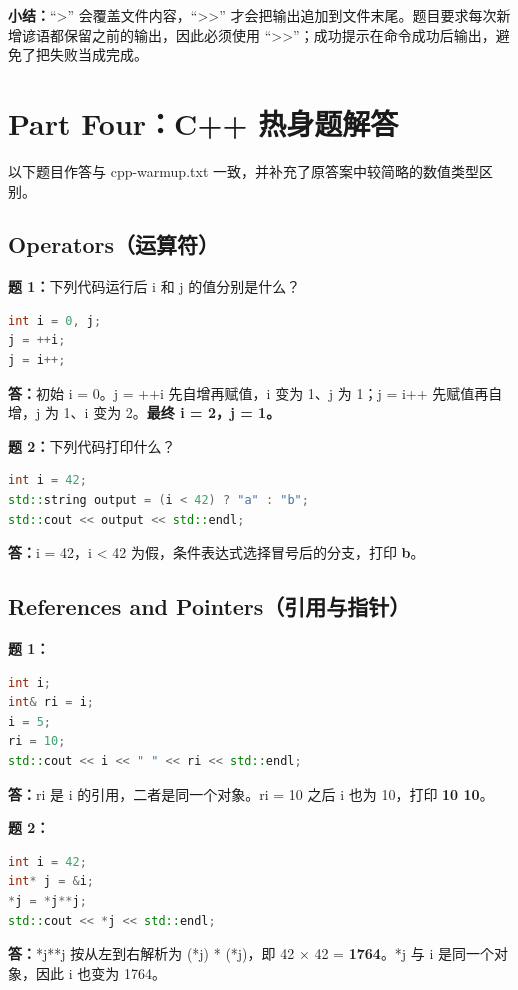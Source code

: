 \documentclass[12pt,a4paper]{ctexart}
\begin{document}
\textbf{小结：}``>'' 会覆盖文件内容，``>>'' 才会把输出追加到文件末尾。题目要求每次新增谚语都保留之前的输出，因此必须使用 ``>>''；成功提示在命令成功后输出，避免了把失败当成完成。

\newpage

\section{Part Four：C++ 热身题解答}

以下题目作答与 cpp-warmup.txt 一致，并补充了原答案中较简略的数值类型区别。

\subsection{Operators（运算符）}

\textbf{题 1：}下列代码运行后 i 和 j 的值分别是什么？
\begin{lstlisting}[language=C++]
int i = 0, j;
j = ++i;
j = i++;
\end{lstlisting}
\textbf{答：}初始 i = 0。j = ++i 先自增再赋值，i 变为 1、j 为 1；j = i++ 先赋值再自增，j 为 1、i 变为 2。\textbf{最终 i = 2，j = 1。}

\textbf{题 2：}下列代码打印什么？
\begin{lstlisting}[language=C++]
int i = 42;
std::string output = (i < 42) ? "a" : "b";
std::cout << output << std::endl;
\end{lstlisting}
\textbf{答：}i = 42，i < 42 为假，条件表达式选择冒号后的分支，打印 \textbf{b}。

\subsection{References and Pointers（引用与指针）}

\textbf{题 1：}
\begin{lstlisting}[language=C++]
int i;
int& ri = i;
i = 5;
ri = 10;
std::cout << i << " " << ri << std::endl;
\end{lstlisting}
\textbf{答：}ri 是 i 的引用，二者是同一个对象。ri = 10 之后 i 也为 10，打印 \textbf{10 10}。

\textbf{题 2：}
\begin{lstlisting}[language=C++]
int i = 42;
int* j = &i;
*j = *j**j;
std::cout << *j << std::endl;
\end{lstlisting}
\textbf{答：}*j**j 按从左到右解析为 (*j) * (*j)，即 42 × 42 = \textbf{1764}。*j 与 i 是同一个对象，因此 i 也变为 1764。
\end{document}
